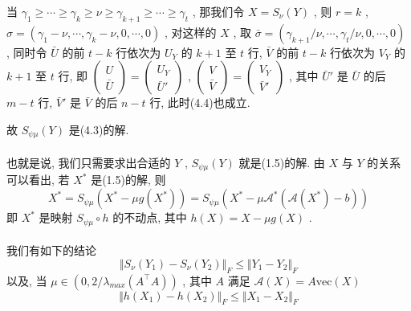 \documentclass[UTF8]{ctexart}
\numberwithin{equation}{section}
\begin{document}
		当 $\gamma_1 \ge \cdots \ge \gamma_k \ge \nu \ge \gamma_{k+1} \ge \cdots \ge \gamma_t$ , 那我们令 $X = S_\nu(Y)$ , 则 $r = k$ , $\sigma = (\gamma_1 - \nu, \cdots, \gamma_k - \nu, 0, \cdots, 0)$ , 对这样的 $X$ , 取 $\bar{\sigma} = (\gamma_{k+1}/\nu, \cdots, \gamma_{t}/\nu, 0, \cdots, 0)$ , 同时令 $\bar{U}$ 的前 $t - k$ 行依次为 $U_Y$ 的 $k + 1$ 至 $t$ 行, $\bar{V}$ 的前 $t - k$ 行依次为 $V_Y$ 的 $k + 1$ 至 $t$ 行, 即 
		$
			\begin{pmatrix}
				U \\ \bar{U}
			\end{pmatrix} 
			=
			\begin{pmatrix}
				U_Y \\ \bar{U}'
			\end{pmatrix}
		$
		,
		$
			\begin{pmatrix}
				V \\ \bar{V}
			\end{pmatrix} 
			=
			\begin{pmatrix}
				V_Y \\ \bar{V}'
			\end{pmatrix}
		$ ,
		其中 $\bar{U}'$ 是 $\bar{U}$ 的后 $m - t$ 行, $\bar{V}'$ 是 $\bar{V}$ 的后 $n - t$ 行, 此时(4.4)也成立.

		故 $S_{\psi \mu}(Y)$ 是(4.3)的解.
		
		\paragraph{}\quad 也就是说, 我们只需要求出合适的 $Y$ , $S_{\psi \mu}(Y)$ 就是(1.5)的解. 由 $X$ 与 $Y$ 的关系可以看出, 若 $X^*$ 是(1.5)的解, 则
			\begin{equation}
				X^* = S_{\psi \mu}(X^* - \mu g(X^*)) = S_{\psi \mu}(X^* - \mu \mathcal{A}^*(\mathcal{A}(X^*) - b))
			\end{equation}
		即 $X^*$ 是映射 $S_{\psi \mu} \circ h$ 的不动点, 其中 $h(X) = X - \mu g(X)$ .

		\paragraph{}\quad 我们有如下的结论
			\begin{equation}
				\Vert{S_\nu(Y_1) - S_\nu(Y_2)}\Vert_F \le \Vert{Y_1 - Y_2}\Vert_F
			\end{equation}
			以及, 当 $\mu \in (0, 2/\lambda_{max}(A ^\top A))$ , 其中 $A$ 满足 $\mathcal{A}(X) = A \text{vec}(X)$
			\begin{equation}
				\Vert{h(X_1) - h(X_2)}\Vert_F \le \Vert{X_1 - X_2}\Vert_F
			\end{equation}
		
\end{document}
